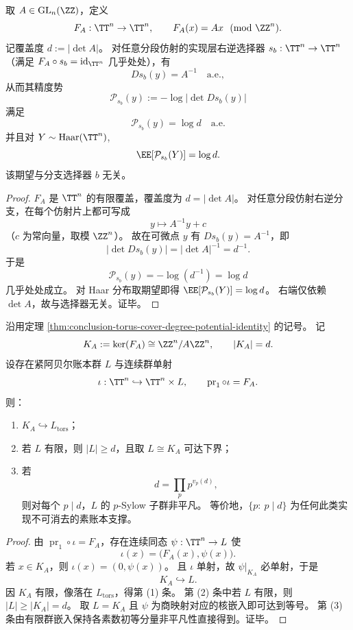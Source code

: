\begin{theorem}\label{thm:conclusion-torus-cover-degree-potential-identity}
取 \(A\in \mathrm{GL}_n(\ZZ)\)，定义
\[
F_A:\TT^n\to \TT^n,\qquad F_A(x)=Ax\ \ (\mathrm{mod}\ \ZZ^n).
\]
记覆盖度 \(d:=|\det A|\)。
对任意分段仿射的实现层右逆选择器 \(s_b:\TT^n\to\TT^n\)（满足 \(F_A\circ s_b=\mathrm{id}_{\TT^n}\) 几乎处处），有
\[
Ds_b(y)=A^{-1}\quad\text{a.e.},
\]
从而其精度势
\[
\mathcal P_{s_b}(y):=-\log|\det Ds_b(y)|
\]
满足
\[
\mathcal P_{s_b}(y)=\log d\quad\text{a.e.}
\]
并且对 \(Y\sim\mathrm{Haar}(\TT^n)\),
\[
\EE[\mathcal P_{s_b}(Y)]=\log d.
\]
该期望与分支选择器 \(b\) 无关。
\end{theorem}
\begin{proof}
\(F_A\) 是 \(\TT^n\) 的有限覆盖，覆盖度为 \(d=|\det A|\)。
对任意分段仿射右逆分支，在每个仿射片上都可写成
\[
y\longmapsto A^{-1}y+c
\]
（\(c\) 为常向量，取模 \(\ZZ^n\)）。
故在可微点 \(y\) 有 \(Ds_b(y)=A^{-1}\)，即
\[
|\det Ds_b(y)|=|\det A|^{-1}=d^{-1}.
\]
于是
\[
\mathcal P_{s_b}(y)=-\log(d^{-1})=\log d
\]
几乎处处成立。
对 Haar 分布取期望即得 \(\EE[\mathcal P_{s_b}(Y)]=\log d\)。
右端仅依赖 \(\det A\)，故与选择器无关。证毕。
\end{proof}

\begin{theorem}[覆盖核的最小素账本签名]\label{thm:conclusion-cover-kernel-min-prime-ledger-signature}
沿用定理 \ref{thm:conclusion-torus-cover-degree-potential-identity} 的记号。
记
\[
K_A:=\ker(F_A)\cong \ZZ^n/A\ZZ^n,\qquad |K_A|=d.
\]
设存在紧阿贝尔账本群 \(L\) 与连续群单射
\[
\iota:\TT^n\hookrightarrow \TT^n\times L,\qquad
\operatorname{pr}_1\circ \iota=F_A.
\]
则：
\begin{enumerate}
  \item \(K_A\hookrightarrow L_{\mathrm{tors}}\)；
  \item 若 \(L\) 有限，则 \(|L|\ge d\)，且取 \(L\cong K_A\) 可达下界；
  \item 若
  \[
  d=\prod_{p}p^{v_p(d)},
  \]
  则对每个 \(p\mid d\)，\(L\) 的 \(p\)-Sylow 子群非平凡。
  等价地，\(\{p:\ p\mid d\}\) 为任何此类实现不可消去的素账本支撑。
\end{enumerate}
\end{theorem}
\begin{proof}
由 \(\operatorname{pr}_1\circ\iota=F_A\)，存在连续同态 \(\psi:\TT^n\to L\) 使
\[
\iota(x)=\bigl(F_A(x),\psi(x)\bigr).
\]
若 \(x\in K_A\)，则 \(\iota(x)=(0,\psi(x))\)。
且 \(\iota\) 单射，故 \(\psi|_{K_A}\) 必单射，于是
\[
K_A\hookrightarrow L.
\]
因 \(K_A\) 有限，像落在 \(L_{\mathrm{tors}}\)，得第 (1) 条。
第 (2) 条中若 \(L\) 有限，则 \(|L|\ge |K_A|=d\)。
取 \(L=K_A\) 且 \(\psi\) 为商映射对应的核嵌入即可达到等号。
第 (3) 条由有限群嵌入保持各素数初等分量非平凡性直接得到。证毕。
\end{proof}


